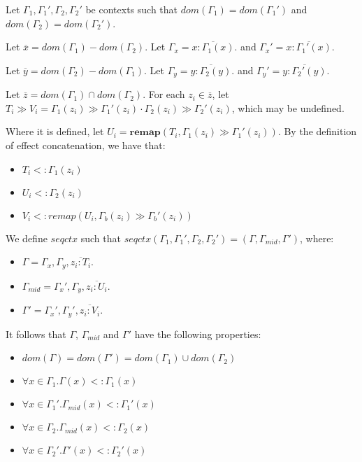 \documentclass[preprint]{sigplanconf}
\newcommand{\remapapp}[3]{\ensuremath{\mathbf{remap}(#1, #2 \gg #3)}}
\begin{document}
Let $\Gamma_1, \Gamma_1', \Gamma_2, \Gamma_2'$ be contexts such
that $dom(\Gamma_1) = dom(\Gamma_1')$ and $dom(\Gamma_2) = dom(\Gamma_2')$.

Let $\overline{x} = dom(\Gamma_1) - dom(\Gamma_2)$.
Let $\Gamma_x = \overline{x : \Gamma_1(x)}$.
and $\Gamma_x' = \overline{x : \Gamma_1'(x)}$.

Let $\overline{y} = dom(\Gamma_2) - dom(\Gamma_1)$.
Let $\Gamma_y = \overline{y : \Gamma_2(y)}$.
and $\Gamma_y' = \overline{y : \Gamma_2'(y)}$.

Let $\overline{z} = dom(\Gamma_1) \cap dom(\Gamma_2)$. For each
$z_i \in \overline{z}$, let $T_i \gg V_i = 
\Gamma_1(z_i) \gg \Gamma_1'(z_i) \cdot \Gamma_2(z_i) \gg \Gamma_2'(z_i)$,
which may be undefined. 

Where it is defined, let $U_i = \remapapp{T_i}{\Gamma_1(z_i)}{\Gamma_1'(z_i)}$.
By the definition of effect concatenation, we have that:

\begin{itemize}
\item $T_i <: \Gamma_1(z_i)$
\item $U_i <: \Gamma_2(z_i)$
\item $V_i <: remap(U_i, \Gamma_b(z_i) \gg \Gamma_b'(z_i))$
\end{itemize}

We define $\mathit{seqctx}$ such that
$\mathit{seqctx}(\Gamma_1, \Gamma_1', \Gamma_2, \Gamma_2') = (\Gamma, \Gamma_{mid}, \Gamma')$,
where:

\begin{itemize}
\item $\Gamma = \Gamma_x, \Gamma_y, \overline{z_i : T_i}$.
\item $\Gamma_{mid} = \Gamma_x', \Gamma_y, \overline{z_i : U_i}$.
\item $\Gamma' = \Gamma_x', \Gamma_y', \overline{z_i : V_i}$.
\end{itemize}

It follows that $\Gamma$, $\Gamma_{mid}$ and $\Gamma'$ have the following
properties:

\begin{itemize}
\item $dom(\Gamma) = dom(\Gamma') = dom(\Gamma_1) \cup dom(\Gamma_2)$
\item $\forall x \in \Gamma_1 . \Gamma(x) <: \Gamma_1(x)$
\item $\forall x \in \Gamma_1' . \Gamma_{mid}(x) <: \Gamma_1'(x)$
\item $\forall x \in \Gamma_2 . \Gamma_{mid}(x) <: \Gamma_2(x)$
\item $\forall x \in \Gamma_2' . \Gamma'(x) <: \Gamma_2'(x)$
\end{itemize}
\end{document}
